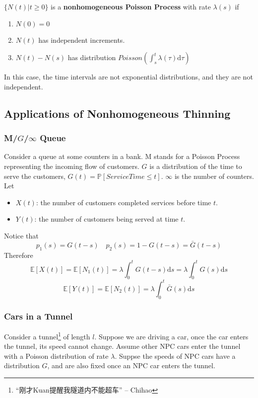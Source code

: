        \begin{definition}\label{def:NonhomogeneousPoissonProcess}
            $\{ N(t) | t \ge 0 \}$ is a \textbf{nonhomogeneous Poisson Process} with rate $\lambda(s)$ if
            \begin{enumerate}
                \item $N(0)=0$
                \item $N(t)$ has independent increments.
                \item $N(t)-N(s)$ has distribution $Poisson\left(\int_s^t \lambda(\tau)\mathrm{d}\tau\right)$
            \end{enumerate}
        \end{definition}
        \begin{remark}
            In this case, the time intervals are not exponential distributions, and they are not independent.
        \end{remark}

    \subsection{Applications of Nonhomogeneous Thinning}

        \subsubsection{M/$G$/$\infty$ Queue}
        Consider a queue at some counters in a bank. M stands for a Poisson Process representing the incoming flow of customers. $G$ is a distribution of the time to serve the customers, $G(t) = \mathbb{P}[ServiceTime \le t]$. $\infty$ is the number of counters. Let
        \begin{itemize}
            \item $X(t)$: the number of customers completed services before time $t$.
            \item $Y(t)$: the number of customers being served at time $t$.
        \end{itemize}

        Notice that
        \[ p_1(s) = G(t-s) \quad p_2(s) = 1 - G(t-s) = \bar{G}(t-s) \]
        Therefore
        \[ \mathbb{E}[X(t)] = \mathbb{E}[N_1(t)] = \lambda\int_0^t G(t-s)\mathrm{d}s = \lambda\int_0^t G(s)\mathrm{d}s \]
        \[ \mathbb{E}[Y(t)] = \mathbb{E}[N_2(t)] = \lambda\int_0^t \bar{G}(s)\mathrm{d}s \]

        \subsubsection{Cars in a Tunnel}
        Consider a tunnel\footnote{“刚才Kuan提醒我隧道内不能超车” -- Chihao} of length $l$. Suppose we are driving a car, once the car enters the tunnel, its speed cannot change. Assume other NPC cars enter the tunnel with a Poisson distribution of rate $\lambda$. Suppse the speeds of NPC cars have a distribution $G$, and are also fixed once an NPC car enters the tunnel.

